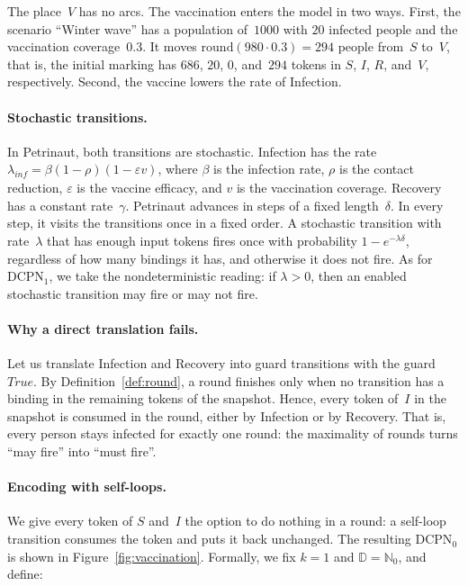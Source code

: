 \documentclass[11pt]{article}
\theoremstyle{definition}
\newcommand{\NatZero}{\mathbb{N}_0}
\newcommand{\Dom}{\mathbb{D}}
\newcommand{\DCPN}[1]{\texorpdfstring{\textup{DCPN}\ensuremath{_{#1}}}{DCPN#1}}
\begin{document}
The place~$V$ has no arcs. The vaccination enters the model in two ways.
First, the scenario ``Winter wave'' has a population of~$1000$ with $20$
infected people and the vaccination coverage~$0.3$. It moves
$\mathrm{round}(980 \cdot 0.3) = 294$ people from~$S$ to~$V$, that is, the
initial marking has $686$, $20$, $0$, and~$294$ tokens in $S$, $I$, $R$,
and~$V$, respectively. Second, the vaccine lowers the rate of Infection.

\paragraph{Stochastic transitions.}
In Petrinaut, both transitions are stochastic. Infection has the rate
$\lambda_{\mathit{inf}} = \beta (1 - \rho)(1 - \varepsilon v)$, where
$\beta$ is the infection rate, $\rho$ is the contact reduction,
$\varepsilon$ is the vaccine efficacy, and $v$ is the vaccination coverage.
Recovery has a constant rate~$\gamma$. Petrinaut advances in steps of a
fixed length~$\delta$. In every step, it visits the transitions once in a
fixed order. A stochastic transition with rate~$\lambda$ that has enough
input tokens fires once with probability $1 - e^{-\lambda \delta}$,
regardless of how many bindings it has, and otherwise it does not fire. As
for \DCPN{1}, we take the nondeterministic reading: if $\lambda > 0$, then
an enabled stochastic transition may fire or may not fire.

\paragraph{Why a direct translation fails.}
Let us translate Infection and Recovery into guard transitions with the
guard~$\mathit{True}$. By Definition~\ref{def:round}, a round finishes only
when no transition has a binding in the remaining tokens of the snapshot.
Hence, every token of~$I$ in the snapshot is consumed in the round, either
by Infection or by Recovery. That is, every person stays infected for
exactly one round: the maximality of rounds turns ``may fire'' into ``must
fire''.

\paragraph{Encoding with self-loops.}
We give every token of $S$ and~$I$ the option to do nothing in a round: a
self-loop transition consumes the token and puts it back unchanged. The
resulting \DCPN{0} is shown in Figure~\ref{fig:vaccination}. Formally, we
fix $k = 1$ and $\Dom = \NatZero$, and define:
\end{document}
